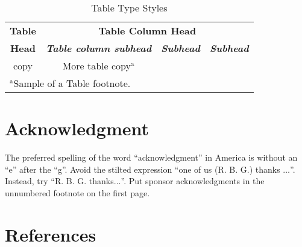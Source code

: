 \documentclass[conference]{IEEEtran}
\begin{document}
\begin{table}[htbp]
\caption{Table Type Styles}
\begin{center}
\begin{tabular}{|c|c|c|c|}
\hline
\textbf{Table}&\multicolumn{3}{|c|}{\textbf{Table Column Head}} \\
\cline{2-4} 
\textbf{Head} & \textbf{\textit{Table column subhead}}& \textbf{\textit{Subhead}}& \textbf{\textit{Subhead}} \\
\hline
copy& More table copy$^{\mathrm{a}}$& &  \\
\hline
\multicolumn{4}{l}{$^{\mathrm{a}}$Sample of a Table footnote.}
\end{tabular}
\label{tab1}
\end{center}
\end{table}

\section*{Acknowledgment}

The preferred spelling of the word ``acknowledgment'' in America is without 
an ``e'' after the ``g''. Avoid the stilted expression ``one of us (R. B. 
G.) thanks $\ldots$''. Instead, try ``R. B. G. thanks$\ldots$''. Put sponsor 
acknowledgments in the unnumbered footnote on the first page.

\section*{References}



\end{document}
